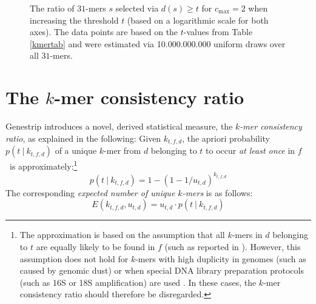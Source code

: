 \documentclass[pdflatex,sn-vancouver-num]{sn-jnl}
\begin{document}
    \begin{figure}[h]%
        \centering
        \caption{The ratio of $31$-mers $s$ selected via $d(s) \geq t$ for $c_{\max} = 2$ when increasing the threshold $t$ (based on a logarithmic scale for both axes). The data points are based on the $t$-values from Table \ref{kmertab} and were estimated via 10.000.000.000 uniform draws over all $31$-mers.}\label{dustfilterratio}
    \end{figure}

\section{The $k$-mer consistency ratio}
\label{kcratio}
    Genestrip introduces a novel, derived statistical measure, the \emph{$k$-mer consistency ratio}, as explained in the following: Given $k_{t,f,d}$, the apriori probability $p(t\ |\ k_{t,f,d})$ of a unique $k$-mer from $d$ belonging to $t$ to occur \emph{at least once} in $f$\ is approximately:\footnote{The approximation is based on the assumption that all $k$-mers in $d$ belonging to $t$ are equally likely to be found in $f$ (such as reported in \cite[Fig. 3]{nanoporeticks}). However, this assumption does not hold for $k$-mers with high duplicity in genomes (such as caused by genomic dust) or when special DNA library preparation protocols (such as 16S or 18S amplification) are used \citep{Wensel:2022aa,16srrnause}. In these cases, the $k$-mer consistency ratio should therefore be disregarded.}
    \begin{equation}
        \label{ptk}
        p(t\ |\ k_{t,f,d}) = 1 - (1 - 1/u_{t,d})^{k_{t,f,d}}
    \end{equation}
    The corresponding \emph{expected number of unique $k$-mers} is as follows:
    \begin{equation}
        \label{E}
        E(k_{t,f,d},u_{t,d}) = u_{t,d} \cdot p(t\ |\ k_{t,f,d})
    \end{equation}
\end{document}
